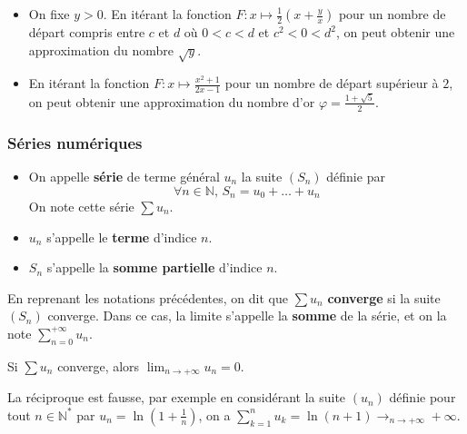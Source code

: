   \begin{example}
    \begin{itemize}
      \item On fixe $y > 0$. En itérant la fonction $F : x \mapsto \frac{1}{2} \left( x + \frac{y}{x} \right)$ pour un nombre de départ compris entre $c$ et $d$ où $0 < c < d$ et $c^2 < 0 < d^2$, on peut obtenir une approximation du nombre $\sqrt{y}$.
      \item En itérant la fonction $F : x \mapsto \frac{x^2+1}{2x-1}$ pour un nombre de départ supérieur à $2$, on peut obtenir une approximation du nombre d'or $\varphi = \frac{1+\sqrt{5}}{2}$.
    \end{itemize}
  \end{example}

  \subsubsection{Séries numériques}

  \label{223-3}


  \begin{definition}
    \begin{itemize}
      \item On appelle \textbf{série} de terme général $u_n$ la suite $(S_n)$ définie par
      \[ \forall n \in \mathbb{N}, \, S_n = u_0 + \dots + u_n \]
      On note cette série $\sum u_n$.
      \item $u_n$ s'appelle le \textbf{terme} d'indice $n$.
      \item $S_n$ s'appelle la \textbf{somme partielle} d'indice $n$.
    \end{itemize}
  \end{definition}

  \begin{definition}
    En reprenant les notations précédentes, on dit que $\sum u_n$ \textbf{converge} si la suite $(S_n)$ converge. Dans ce cas, la limite s'appelle la \textbf{somme} de la série, et on la note $\sum_{n=0}^{+\infty} u_n$.
  \end{definition}


  \begin{proposition}
    Si $\sum u_n$ converge, alors $\lim_{n \rightarrow +\infty} u_n = 0$.
  \end{proposition}

  \begin{cexample}
    La réciproque est fausse, par exemple en considérant la suite $(u_n)$ définie pour tout $n \in \mathbb{N}^*$ par $u_n = \ln(1 + \frac{1}{n})$, on a $\sum_{k=1}^{n} u_k = \ln(n+1) \longrightarrow_{n \rightarrow +\infty} +\infty$.
  \end{cexample}

